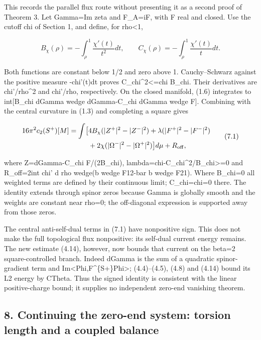 \documentclass[
  10pt,
]{article}
\begin{document}
This records the parallel flux route without presenting it as a second
proof of Theorem 3. Let Gamma=Im zeta and F\_A=iF, with F real and
closed. Use the cutoff chi of Section 1, and define, for rho\textless1,

\[
 B_\chi(\rho)=-\int_\rho^1\frac{\chi'(t)}{t^2}dt,
 \qquad C_\chi(\rho)=-\int_\rho^1\frac{\chi'(t)}t dt.
\]

Both functions are constant below 1/2 and zero above 1. Cauchy--Schwarz
against the positive measure -chi'(t)dt proves C\_chi\^{}2\textless=chi
B\_chi. Their derivatives are chi'/rho\^{}2 and chi'/rho, respectively.
On the closed manifold, (1.6) integrates to int{[}B\_chi dGamma wedge
dGamma-C\_chi dGamma wedge F{]}. Combining with the central curvature in
(1.3) and completing a square gives

\[
\begin{aligned}
16\pi^2c_2(S^+)[M]=\int\bigl[&4B_\chi(|Z^+|^2-|Z^-|^2)
 +\lambda(|F^+|^2-|F^-|^2)\\
 &+2\chi(|\Omega^-|^2-|\Omega^+|^2)\bigr]d\mu+R_{\rm off},
\end{aligned}                                                     \tag{7.1}
\]

where Z=dGamma-C\_chi F/(2B\_chi),
lambda=chi-C\_chi\^{}2/B\_chi\textgreater=0 and R\_off=2int chi' d rho
wedge(b wedge F12-bar b wedge F21). Where B\_chi=0 all weighted terms
are defined by their continuous limit; C\_chi=chi=0 there. The identity
extends through spinor zeros because Gamma is globally smooth and the
weights are constant near rho=0; the off-diagonal expression is
supported away from those zeros.

The central anti-self-dual terms in (7.1) have nonpositive sign. This
does not make the full topological flux nonpositive: its self-dual
current energy remains. The new estimate (4.14), however, now bounds
that current on the beta=2 square-controlled branch. Indeed dGamma is
the sum of a quadratic spinor-gradient term and
Im\textless Phi,F\^{}\{S+\}Phi\textgreater; (4.4)--(4.5), (4.8) and
(4.14) bound its L2 energy by CTheta. Thus the signed identity is
consistent with the linear positive-charge bound; it supplies no
independent zero-end vanishing theorem.

\hypertarget{continuing-the-zero-end-system-torsion-length-and-a-coupled-balance}{%
\subsection{8. Continuing the zero-end system: torsion length and a
coupled
balance}\label{continuing-the-zero-end-system-torsion-length-and-a-coupled-balance}}
\end{document}
